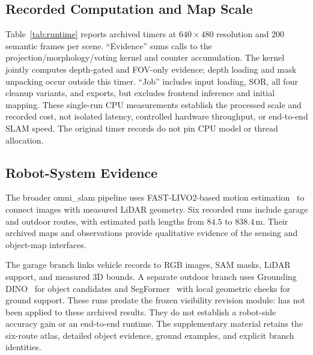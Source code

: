 \subsection{Recorded Computation and Map Scale}
\label{sec:runtime}
Table~\ref{tab:runtime} reports archived timers at $640\!\times\!480$ resolution and 200 semantic frames per scene. ``Evidence'' sums calls to the projection/morphology/voting kernel and counter accumulation. The kernel jointly computes depth-gated and FOV-only evidence; depth loading and mask unpacking occur outside this timer. ``Job'' includes input loading, SOR, all four cleanup variants, and exports, but excludes frontend inference and initial mapping. These single-run CPU measurements establish the processed scale and recorded cost, not isolated \ours{} latency, controlled hardware throughput, or end-to-end SLAM speed. The original timer records do not pin CPU model or thread allocation.

\begin{table}[t]
\centering
\small
\setlength{\tabcolsep}{3pt}
\caption{Archived computation, in seconds, on the finalized strong-baseline foreground map. Evidence and job timers have different scopes; neither is standalone \ours{} runtime.}
\label{tab:runtime}

\end{table}

\subsection{Robot-System Evidence}
The broader omni\_slam pipeline uses FAST-LIVO2-based motion estimation~\cite{zheng2024fastlivo2} to connect images with measured LiDAR geometry. Six recorded runs include garage and outdoor routes, with estimated path lengths from $84.5$ to $838.4\,\mathrm m$. Their archived maps and observations provide qualitative evidence of the sensing and object-map interfaces.

The garage branch links vehicle records to RGB images, SAM masks, LiDAR support, and measured 3D bounds. A separate outdoor branch uses Grounding DINO~\cite{liu2023groundingdino} for object candidates and SegFormer~\cite{xie2021segformer} with local geometric checks for ground support. These runs predate the frozen visibility revision module: \ours{} has not been applied to these archived results. They do not establish a robot-side accuracy gain or an end-to-end runtime. The supplementary material retains the six-route atlas, detailed object evidence, ground examples, and explicit branch identities.
